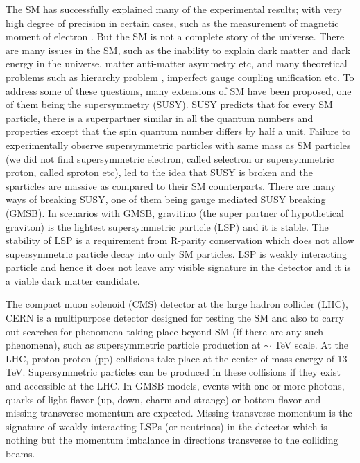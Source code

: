 The SM has successfully explained many of the experimental results; with very high degree of precision in certain cases, such as 
the measurement of magnetic moment of electron \cite{PhysRevLett.97.030801}. But the SM is not 
a complete story of the universe. %
There are many issues in the SM, such as the inability to explain dark matter \cite{Zwicky:1933gu,Clowe:2006eq} and dark energy 
\cite{Riess:1998cb} in the universe, 
matter anti-matter asymmetry \cite{doi:10.1146/annurev.aa.14.090176.002011,Canetti:2012zc} etc, and many theoretical problems such as 
hierarchy problem \cite{tHooft:1979rat}, imperfect gauge coupling unification etc. To address some of these questions, many 
extensions of SM have been proposed, one of them being the supersymmetry (SUSY). SUSY predicts that for every SM particle, there is a 
superpartner similar in all the quantum numbers and properties except that the spin quantum number differs by half a unit. Failure to 
experimentally observe supersymmetric particles with same mass as SM particles (we did not find supersymmetric electron, 
called selectron or supersymmetric proton, called sproton etc), led to the idea that SUSY is broken and the sparticles are massive as compared to their SM 
counterparts. There are many ways of breaking SUSY, one of them being gauge mediated SUSY breaking 
(GMSB). In scenarios with GMSB, gravitino (the super partner of hypothetical graviton) is the lightest supersymmetric particle (LSP) and it is 
stable. The stability of LSP is a requirement from R-parity conservation which does not allow supersymmetric particle decay into only SM 
particles. LSP is weakly interacting particle and hence it does not leave any visible signature in the detector and it is a viable dark 
matter candidate.

The compact muon solenoid (CMS) detector at the large hadron collider (LHC), CERN is a multipurpose detector designed for
testing the SM and also to carry out searches for phenomena taking place beyond SM (if there are any such phenomena),
such as supersymmetric particle production at $\sim$ TeV scale. At the LHC, proton-proton (pp) collisions 
take place at the center of mass energy of 13 TeV. Supersymmetric particles can be produced in these collisions if they exist and 
accessible at the LHC. In GMSB models, events with one or more photons, quarks of light flavor (up, down, charm and strange) or bottom 
flavor and missing transverse momentum are expected. Missing transverse momentum is the signature of weakly interacting LSPs (or 
neutrinos) in the detector which is nothing but the momentum imbalance in directions transverse to the colliding beams.


